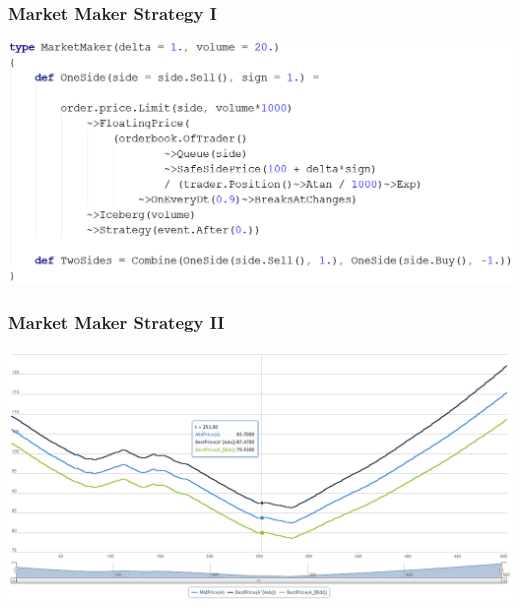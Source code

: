\documentclass{beamer}
\begin{document}
\begin{frame}
\frametitle{Market Maker Strategy I}
\includegraphics[width=1\linewidth]{marketmaker_strategy.png}
\end{frame}
\begin{frame}
\frametitle{Market Maker Strategy II}
\includegraphics[width=1\linewidth]{marketmaker.png}
\end{frame}
\end{document}
